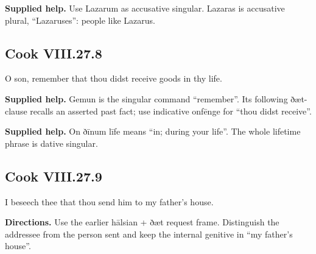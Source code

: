 \textbf{Supplied help.} Use Lazarum as accusative singular. Lazaras is accusative plural, “Lazaruses”: people like Lazarus.

\par\begin{minipage}{\linewidth}\raggedright
\subsection*{Cook VIII.27.8}

O son, remember that thou didst receive goods in thy life.

\end{minipage}\par\addvspace{4pt}

\textbf{Supplied help.} Gemun is the singular command “remember”. Its following ðæt-clause recalls an asserted past fact; use indicative onfēnge for “thou didst receive”.

\textbf{Supplied help.} On ðīnum līfe means “in; during your life”. The whole lifetime phrase is dative singular.

\par\begin{minipage}{\linewidth}\raggedright
\subsection*{Cook VIII.27.9}

I beseech thee that thou send him to my father’s house.

\textbf{Directions.} Use the earlier hālsian + ðæt request frame. Distinguish the addressee from the person sent and keep the internal genitive in “my father’s house”.

\end{minipage}\par\addvspace{4pt}

